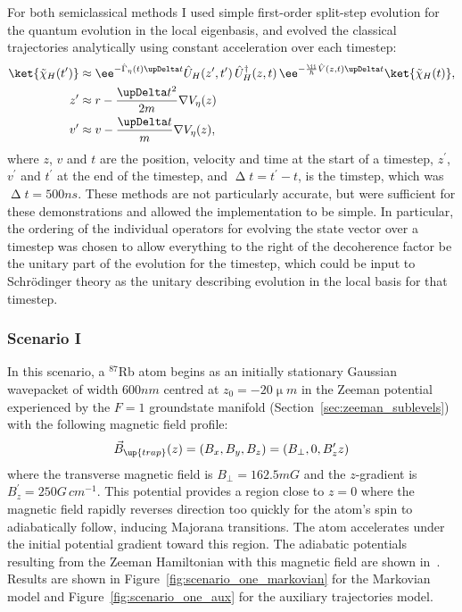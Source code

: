 For both semiclassical methods I used simple first-order split-step evolution for the quantum evolution in the local eigenbasis, and evolved the classical trajectories analytically using constant acceleration over each timestep:
\begin{align}
\ket{\tilde\chi_H(t^\prime)} &\approx \ee^{-\hat\Gamma_\eta(t)\upDelta t}\hat U_H(z^\prime, t^\prime)\,\hat U_H^\dagger(z, t)\,\ee^{-\frac\ii\hbar \hat V(z, t)\upDelta t}\ket{\tilde\chi_H(t)},\\
z^\prime &\approx r - \frac{\upDelta t^2}{2m}\nabla V_\eta(z)\\
v^\prime &\approx v - \frac{\upDelta t}{m}\nabla V_\eta(z),
\end{align}
where $z$, $v$ and $t$ are the position, velocity and time at the start of a timestep, $z^\prime$, $v^\prime$ and $t^\prime$ at the end of the timestep, and $\upDelta t = t^\prime - t$, is the timstep, which was $\upDelta t = 500\unit{ns}$. These methods are not particularly accurate, but were sufficient for these demonstrations and allowed the implementation to be simple. In particular, the ordering of the individual operators for evolving the state vector over a timestep was chosen to allow everything to the right of the decoherence factor be the unitary part of the evolution for the timestep, which could be input to Schr\"odinger theory as the unitary describing evolution in the local basis for that timestep.

\subsubsection{Scenario I}

In this scenario, a $^{87}$Rb atom begins as an initially stationary Gaussian wavepacket of width $600\unit{nm}$ centred at $z_0 = -20\unit{\upmu m}$ in the Zeeman potential experienced by the $F=1$ groundstate manifold (Section~\ref{sec:zeeman_sublevels}) with the following magnetic field profile:
\begin{align}
\vec B_\up{trap}(z) = (B_x, B_y, B_z) = \left(B_\perp, 0, B_z^\prime z\right)
\end{align}
where the transverse magnetic field is $B_\perp = 162.5\unit{mG}$ and the $z$-gradient is $B_z^\prime = 250\unit{G\,cm^{-1}}$. This potential provides a region close to $z=0$ where the magnetic field rapidly reverses direction too quickly for the atom's spin to adiabatically follow, inducing Majorana transitions. The atom accelerates under the initial potential gradient toward this region. The adiabatic potentials resulting from the Zeeman Hamiltonian with this magnetic field are shown in~. Results are shown in Figure~\ref{fig:scenario_one_markovian} for the Markovian model and Figure~\ref{fig:scenario_one_aux} for the auxiliary trajectories model.


